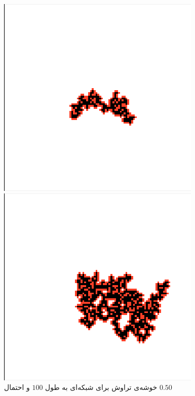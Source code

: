 \documentclass[11pt, a4paper]{article}
\begin{document}
\begin{figure}[h]
	\centering
  \begin{minipage}[b]{0.3\textwidth}
    \includegraphics[width=\textwidth]{q7_100_0.5}
    \caption{خوشه‌ی تراوش برای شبکه‌ای به طول $100$ و احتمال $0.50$}
    \label{fig:q7_100_0.5}
  \end{minipage}
  \hfill
  \begin{minipage}[b]{0.3\textwidth}
    \includegraphics[width=\textwidth]{q7_100_0.55}

\end{minipage}
\end{figure}
\end{document}

